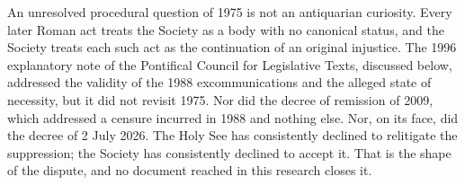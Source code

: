 An unresolved procedural question of 1975 is not an antiquarian
curiosity. Every later Roman act treats the Society as a body with no
canonical status, and the Society treats each such act as the continuation
of an original injustice. The 1996 explanatory note of the Pontifical
Council for Legislative Texts, discussed below, addressed the validity of
the 1988 excommunications and the alleged state of necessity, but it did
not revisit 1975. Nor did the decree of remission of 2009, which
addressed a censure incurred in 1988 and nothing else. Nor, on its face,
did the decree of 2 July 2026. The Holy See has consistently declined to
relitigate the suppression; the Society has consistently declined to
accept it. That is the shape of the dispute, and no document reached in
this research closes it.

\begin{documentinventory}
\end{documentinventory}
